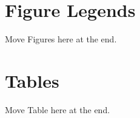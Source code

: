 \documentclass[10pt]{article}
\begin{document}


\section*{Figure Legends}

Move Figures here at the end.

\section*{Tables}

Move Table here at the end.

\end{document}
